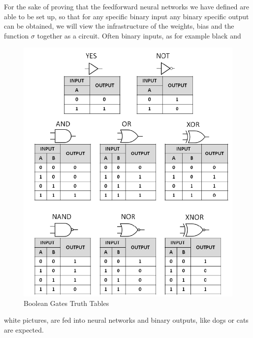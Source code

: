 \documentclass{article}
\theoremstyle{definition}
\newcommand*{\figuretitle}[1]{%
    {\centering%
    \textbf{#1}%
    \par\medskip}%
}
\begin{document}
For the sake of proving that the feedforward neural networks we have defined are able to be set up, so that for any specific binary input any binary specific output can be obtained, we will view the infrastructure of the weights, bias and the function $\sigma$ together as a circuit. Often binary inputs, as for example black and
\begin{figure}
\centering
\includegraphics[scale=0.2]{graphics/Summary-of-the-common-Boolean-logic-gates-with-symbols-and-truth-tables.png}
\caption{Boolean Gates Truth Tables \cite{booleanGates}}
\label{fig:bool_gate}
\end{figure}
white pictures, are fed into neural networks and binary outputs, like dogs or cats are expected.
\end{document}
